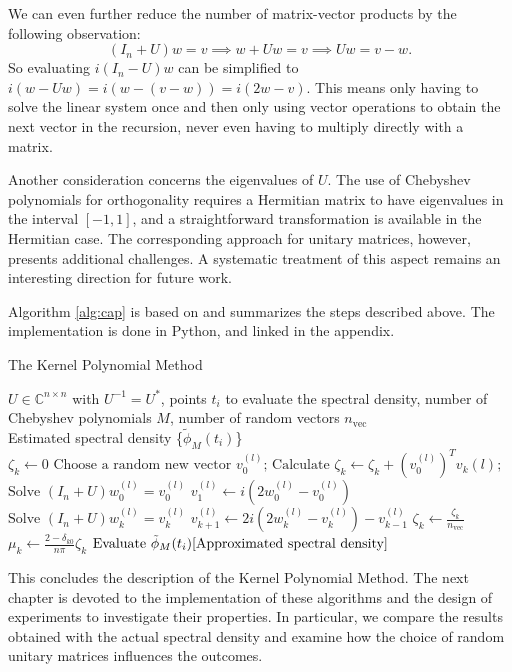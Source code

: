 We can even further reduce the number of matrix-vector products by the following observation: 
\[
(I_n + U) w = v \implies w + Uw = v \implies Uw = v - w.
\]
So evaluating $i(I_n - U)w$ can be simplified to $i(w - Uw) = i(w - (v - w)) = i(2w - v)$. This means only having to solve the linear system once and then only using vector operations to obtain the next vector in the recursion, never even having to multiply directly with a matrix.

Another consideration concerns the eigenvalues of $U$. The use of Chebyshev polynomials for orthogonality requires a Hermitian matrix to have eigenvalues in the interval $[-1, 1]$, and a straightforward transformation is available in the Hermitian case. The corresponding approach for unitary matrices, however, presents additional challenges. A systematic treatment of this aspect remains an interesting direction for future work.

Algorithm \ref{alg:cap} is based on \cite[p.~10]{linsaadyang14} and summarizes the steps described above.
The implementation is done in Python, and linked in the appendix.

\begin{algorithm}[H]
    \caption{The Kernel Polynomial Method}\label{alg:cap}
    \begin{algorithmic}[5]
    \Require $U \in \mathbb{C}^{n \times n}$ with $U^{-1} = U^*$, points $t_i$ to evaluate the spectral density, number of Chebyshev polynomials $M$, number of random vectors $n_{\text{vec}}$\\
    \Ensure Estimated spectral density \{$\tilde{\phi}_M(t_i)$\}\\
    \State $\zeta_k \gets 0$
    \EndFor
    \State $\text{Choose a random new vector } v_0^{(l)}\text{;}$ 
    \State $\text{Calculate } \zeta_k \gets \zeta_k + \left( v_0^{(l)} \right)^T v_k{(l)}\text{;}$  
    \State $\text{Solve } (I_n + U) w_0^{(l)} = v_0^{(l)}$
    \State $v_1^{(l)} \gets i (2w_0^{(l)} - v_0^{(l)})$
    \Else
    \State $\text{Solve } (I_n + U) w_k^{(l)} = v_k^{(l)}$
    \State $v_{k+1}^{(l)} \gets 2 i (2w_k^{(l)} - v_k^{(l)}) - v_{k-1}^{(l)}$ 
    \EndIf
    \EndFor
    \EndFor
    \State $\zeta_k \gets \frac{\zeta_k}{n_{\text{vec}}}$
    \State $\mu_k \gets \frac{2 - \delta_{k0}}{n \pi} \zeta_k$
    \EndFor
    \State $\text{Evaluate } \tilde{\phi}_M(t_i) \eqref{Approximated spectral density}$
    \end{algorithmic}
\end{algorithm}

This concludes the description of the Kernel Polynomial Method. The next chapter is devoted to the implementation of these algorithms and the design of experiments to investigate their properties. In particular, we compare the results obtained with the actual spectral density and examine how the choice of random unitary matrices influences the outcomes.